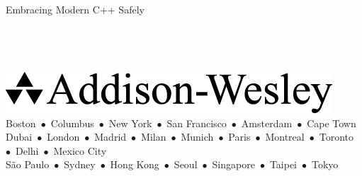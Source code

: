 \thispagestyle{empty}
\begin{center}
{\sfititle Embracing Modern C++ Safely}\\
\vspace*{54pt}
\vspace*{\fill}    %
\\[3ex]
\\[3ex]        %
\\[3ex]
\\[3ex]

\vspace*{\fill}    %
\includegraphics{AWlogoTitlePage-Mac}\\   %
{\footnotesize 
Boston~$\bullet$~Columbus~$\bullet$~New York~$\bullet$~San Francisco~$\bullet$~Amsterdam~$\bullet$~Cape Town\\[1ex]
Dubai~$\bullet$~London~$\bullet$~Madrid~$\bullet$~Milan~$\bullet$~Munich~$\bullet$~Paris~$\bullet$~Montreal~$\bullet$~Toronto~$\bullet$~Delhi~$\bullet$~Mexico City\\[1ex]
S\~{a}o Paulo~$\bullet$~Sydney~$\bullet$~Hong Kong~$\bullet$~Seoul~$\bullet$~Singapore~$\bullet$~Taipei~$\bullet$~Tokyo\\[1ex]
}
\end{center}